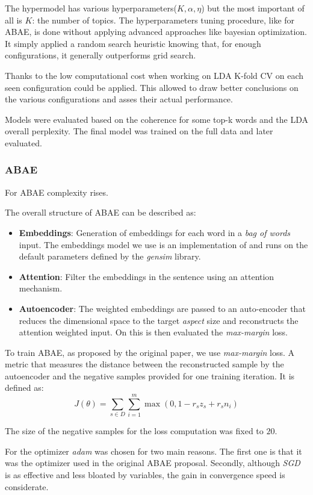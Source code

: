 The hypermodel has various hyperparameters($K,\alpha, \eta$) but the most important of all is $K$: the number of topics.
The hyperparameters tuning procedure, like for ABAE, is done without applying advanced approaches like bayesian optimization.
It simply applied a random search heuristic knowing that, for enough configurations, it generally outperforms grid search.

Thanks to the low computational cost when working on LDA K-fold CV on each seen configuration could be applied.
This allowed to draw better conclusions on the various configurations and asses their actual performance.

Models were evaluated based on the coherence for some top-k words and the LDA overall perplexity.
The final model was trained on the full data and later evaluated.

\subsubsection{ABAE}
For ABAE complexity rises.

The overall structure of ABAE can be described as:
\begin{itemize}
    \item {\textbf{Embeddings}}: Generation of embeddings for each word in a \textit{bag of words} input.
    The embeddings model we use is an implementation of  and runs on the default parameters defined by the \textit{gensim} library.
    \item {\textbf{Attention}}: Filter the embeddings in the sentence using an attention mechanism.
    \item {\textbf{Autoencoder}}: The weighted embeddings are passed to an auto-encoder that reduces the dimensional
    space to the target \textit{aspect} size and reconstructs the attention weighted input.
    On this is then evaluated the \textit{max-margin} loss.
\end{itemize}

To train ABAE, as proposed by the original paper, we use \textit{max-margin} loss.
A metric that measures the distance between the reconstructed sample by the autoencoder and the negative samples
provided for one training iteration.
It is defined as:
$$ J(\theta) = \sum_{s\in D}\sum_{i=1}^m \max(0, 1 - r_sz_s + r_sn_i)$$

The size of the negative samples for the loss computation was fixed to $20$.

For the optimizer \textit{adam} was chosen for two main reasons.
The first one is that it was the optimizer used in the original ABAE proposal.
Secondly, although \textit{SGD} is as effective\cite{wilson2018marginal} and less bloated
by variables, the gain in convergence speed is considerate.

